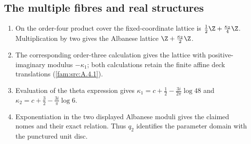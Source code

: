 \subsection{The multiple fibres and real structures}
\RungOne
\begin{enumerate}[label=\arabic*.]
\item On the order-four product cover the fixed-coordinate lattice
is $\frac12\Z+\frac{\kappa_2}{4}\Z$. Multiplication by two gives
the Albanese lattice $\Z+\frac{\kappa_2}{2}\Z$.
\item The corresponding order-three calculation gives the lattice
with positive-imaginary modulus $-\kappa_1$; both calculations retain
the finite affine deck translations (\ref{fam:src:A.4.1}).
\item Evaluation of the theta expression gives
$\kappa_1=c+\frac12-\frac{3i}{2\pi}\log48$ and
$\kappa_2=c+\frac32-\frac{3i}{\pi}\log6$.
\item Exponentiation in the two displayed Albanese moduli gives
the claimed nomes and their exact relation. Thus $q_2$ identifies
the parameter domain with the punctured unit disc.
\end{enumerate}

